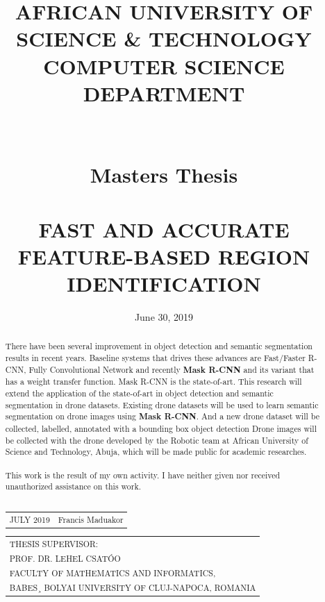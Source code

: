 \documentclass{article}
\title{
\large AFRICAN UNIVERSITY OF SCIENCE \& TECHNOLOGY \\COMPUTER SCIENCE DEPARTMENT\\
\\
\\
Masters Thesis\\
\\
\large FAST AND ACCURATE FEATURE-BASED REGION IDENTIFICATION
}
\date{June 30, 2019}
\begin{document}
 
\begin{titlepage}
\maketitle
\begin{abstract}
\noindent There have been several improvement in object detection and semantic segmentation results in recent years. Baseline systems that drives these advances are Fast/Faster R-CNN, Fully Convolutional Network and recently \textbf{Mask R-CNN} and its variant that has a weight transfer function.  Mask R-CNN is the state-of-art.  This research will extend the application of the state-of-art in object detection and semantic segmentation in drone datasets. Existing drone datasets will be used to learn semantic segmentation on drone images using \textbf{Mask R-CNN}. And a new drone dataset will be collected, labelled, annotated with a bounding box object detection Drone images will be collected with the drone developed by the Robotic team at African University of Science and Technology, Abuja, which will be made public for academic researches.
\\
\\
This work is the result of my own activity. I have neither given nor received unauthorized assistance on this work.
\\
\\

\noindent
\begin{tabular}{lr}
JULY 2019
&
Francis Maduakor
\end{tabular}

\noindent
\begin{tabular}{l}
THESIS SUPERVISOR:\\
PROF. DR. LEHEL CSATÓO \\
FACULTY OF MATHEMATICS AND INFORMATICS, \\
BABES¸ BOLYAI UNIVERSITY OF CLUJ-NAPOCA, ROMANIA 
\end{tabular}








\end{abstract}
\end{titlepage}
\end{document}
